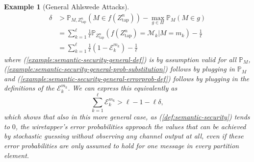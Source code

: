 \documentclass[journal]{IEEEtran}
\newcommand{\lemmaconst}{\delta}
\newcommand{\channelOut}{Z}
\newcommand{\channelOutWiretapper}{\channelOut_\mathrm{tap}}
\newcommand{\codebookBlocklength}{n}
\newcommand{\Probability}{\mathbb{P}}
\newcommand{\errorprob}{\mathcal{E}}
\newcommand{\messageRV}{M}
\newcommand{\messageAlphabet}{\mathcal{M}}
\newcommand{\nPartitionElements}{\ell}
\newcommand{\indexPartitions}{k}
\newcommand{\messageAlphabetElement}{m}
\newcommand{\partition}{{\Pi}}
\newcommand{\wiretapperDecoder}{{f}}
\newcommand{\wiretapperGuesser}{{g}}
\newtheorem{example}{Example}
\begin{document}
\begin{example}[General Ahlswede Attacks]
\begin{align}
\lemmaconst
&>
\Probability_{\messageRV, \channelOutWiretapper^\codebookBlocklength}(\messageRV \in \wiretapperDecoder(\channelOutWiretapper^\codebookBlocklength))
-
\max\limits_{\wiretapperGuesser \in \partition}
\Probability_{\messageRV}(\messageRV \in \wiretapperGuesser)
\\
\label{example:semantic-security-general-prob-substitution}
&=
\sum\limits_{\indexPartitions=1}^\nPartitionElements
\frac{1}{\nPartitionElements}
\Probability_{\channelOutWiretapper^\codebookBlocklength}(\wiretapperDecoder(\channelOutWiretapper^\codebookBlocklength) = \messageAlphabet_\indexPartitions | \messageRV = \messageAlphabetElement_\indexPartitions)
-
\frac{1}{\nPartitionElements}
\\
\label{example:semantic-security-general-errorprob-def}
&=
\sum\limits_{\indexPartitions=1}^\nPartitionElements
\frac{1}{\nPartitionElements}
(1-\errorprob_\indexPartitions^{\messageAlphabetElement_\indexPartitions})
-
\frac{1}{\nPartitionElements}
\end{align}
where (\ref{example:semantic-security-general-def}) is by assumption valid for all $\Probability_\messageRV$, (\ref{example:semantic-security-general-prob-substitution}) follows by plugging in $\Probability_\messageRV$ and (\ref{example:semantic-security-general-errorprob-def}) follows by plugging in the definitions of the $\errorprob_\indexPartitions^{\messageAlphabetElement_\indexPartitions}$. We can express this equivalently as
\[
\sum\limits_{\indexPartitions=1}^\nPartitionElements
\errorprob_\indexPartitions^{\messageAlphabetElement_\indexPartitions}
>
\nPartitionElements - 1 - \nPartitionElements\lemmaconst,
\]
which shows that also in this more general case, as (\ref{def:semantic-security}) tends to $0$, the wiretapper's error probabilities approach the values that can be achieved by stochastic guessing without observing any channel output at all, even if these error probabilities are only assumed to hold for one message in every partition element.
\end{example}
\end{document}
